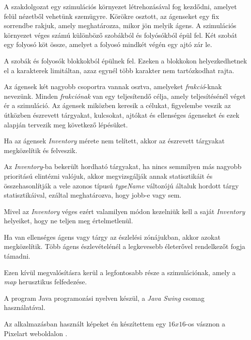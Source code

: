 
A szakdolgozat egy szimulációs környezet létrehozásával fog kezdődni, amelyet felül nézetből vehetünk szemügyre.
Körökre osztott, az ágenseket egy fix sorrendbe rakjuk, amely meghatározza, mikor jön melyik ágens.
A szimulációs környezet véges számú különböző szobákból és folyósókból épül fel. Két szobát egy folyosó köt össze, amelyet a folyosó mindkét végén egy ajtó zár le. 

A szobák és folyosók blokkokból épülnek fel. Ezeken a blokkokon helyezkedhetnek el a karakterek limitáltan, azaz egynél több karakter nem tartózkodhat rajta.

Az ágensek két nagyobb csoportra vannak osztva, amelyeket \textit{frakció}-knak nevezünk. Minden \textit{frakciónak} van egy teljesítendő célja, amely teljesítésénél véget ér a szimuláció.
Az ágensek miközben keresik a célukat, figyelembe veszik az útközben észrevett tárgyakat, kulcsokat, ajtókat és ellenséges ágenseket és ezek alapján tervezik meg következő lépésüket.

Ha az ágensek \textit{Inventory} mérete nem telített, akkor az észrevett tárgyakat megközelítik és felveszik.

Az \textit{Inventory}-ba bekerült hordható tárgyakat, ha nincs semmilyen más nagyobb prioritású elintézni valójuk, akkor megvizsgálják annak statisztikáit és összehasonlítják a vele azonos típusú \textit{typeName} változójú általuk hordott tárgy statisztikáival, ezáltal meghatározva, hogy jobb-e vagy sem.

Mivel az \textit{Inventory} véges ezért valamilyen módon kezelniük kell a saját \textit{Inventory} helyeiket, hogy ne teljen meg értelmetlenül.

Ha van ellenséges ágens vagy tárgy az észlelési zónájukban, akkor azokat megközelítik. Több ágens észlevételénél a legkevesebb életerővel  rendelkezőt fogja támadni.

Ezen kívül megvalósításra kerül a legfontosabb része a szimulációnak, amely a \textit{map} herusztikus felfedezése.

A program Java programozási nyelven \cite{arnold2005java} készül, a \textit{Java Swing} csomag \cite{10.5555/291162} használatával.

Az alkalmazásban használt képeket én készítettem egy $16x16$-os vásznon a Pixelart weboldalon \cite{pixelart}.